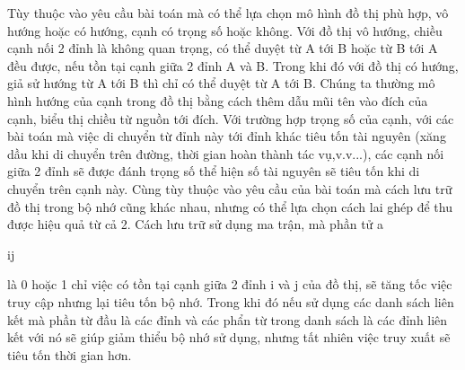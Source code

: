 Tùy thuộc vào yêu cầu bài toán mà có thể lựa chọn mô hình đồ thị phù hợp, vô hướng hoặc có hướng, cạnh có trọng số hoặc không. Với đồ thị vô hướng, chiều cạnh nối 2 đỉnh là không quan trọng, có thể duyệt từ A tới B hoặc từ B tới A đều được, nếu tồn tại cạnh giữa 2 đỉnh A và B. Trong khi đó với đồ thị có hướng, giả sử hướng từ A tới B thì chỉ có thể duyệt từ A tới B. Chúng ta thường mô hình hướng của cạnh trong đồ thị bằng cách thêm dẫu mũi tên vào đích của cạnh, biểu thị chiều từ nguồn tới đích. Với trường hợp trọng số của cạnh, với các bài toán mà việc di chuyển từ đỉnh này tới đỉnh khác tiêu tốn tài nguyên (xăng dầu khi di chuyển trên đường, thời gian hoàn thành tác vụ,v.v...), các cạnh nối giữa 2 đỉnh sẽ được đánh trọng số thể hiện số tài nguyên sẽ tiêu tốn khi di chuyển trên cạnh này.
\linebreak 
\linebreak
Cùng tùy thuộc vào yêu cầu của bài toán mà cách lưu trữ đồ thị trong bộ nhớ cũng khác nhau, nhưng có thể lựa chọn cách lai ghép để thu được hiệu quả từ cả 2. Cách lưu trữ sử dụng ma trận, mà phần tử a\begin{tiny}ij\end{tiny} là 0 hoặc 1 chỉ việc có tồn tại cạnh giữa 2 đỉnh i và j của đồ thị, sẽ tăng tốc việc truy cập nhưng lại tiêu tốn bộ nhớ. Trong khi đó nếu sử dụng các danh sách liên kết mà phần từ đầu là các đỉnh và các phẩn từ trong danh sách là các đỉnh liên kết với nó sẽ giúp giảm thiểu bộ nhớ sử dụng, nhưng tất nhiên việc truy xuất sẽ tiêu tốn thời gian hơn.

